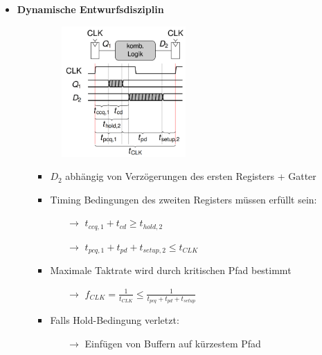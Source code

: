 \documentclass[11pt,a4paper]{article}
\begin{document}
\begin{itemize}
\item \textbf{Dynamische Entwurfsdisziplin}
	\begin{itemize}
	\item[]		
				\begin{minipage}{0.25\textwidth}
					\begin{figure}[H]
					\includegraphics[height=5cm]{entwurfsdisziplin}
					\end{figure}
				\end{minipage}
				\begin{minipage}[t]{0.65\textwidth}
					\vspace{-2.25cm}
					\begin{itemize}
					\item $D_2$ abhängig von Verzögerungen des ersten Registers + Gatter
					\item Timing Bedingungen des zweiten Registers müssen erfüllt sein:
						\begin{itemize}
						\item[$\rightarrow$] $t_{ccq,1}+t_{cd} \geq t_{hold,2}$
						\item[$\rightarrow$] $t_{pcq,1}+t_{pd} + t_{setup,2} \leq t_{CLK}$
						\end{itemize}
					
					\item Maximale Taktrate wird durch kritischen Pfad bestimmt
						\begin{itemize}
						\item[$\rightarrow$] $f_{CLK}=\frac{1}{t_{CLK}} \leq \frac{1}{t_{pcq}+t_{pd}+t_{setup}}$
						\end{itemize}
					\item Falls Hold-Bedingung verletzt: 
						\begin{itemize}
						\item[$\rightarrow$] Einfügen von Buffern auf kürzestem Pfad
						\end{itemize}
					\end{itemize}
				\end{minipage}
	\end{itemize}
	

\end{itemize}
\end{document}
